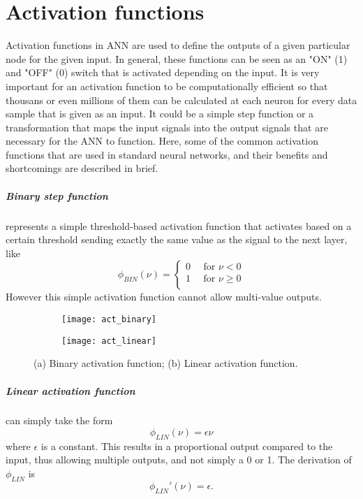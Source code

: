 \chapter{Activation functions}\label{app-act}
Activation functions in ANN are used to define the outputs of a given particular node for the given input. In general, these functions can be seen as an "ON" (1) and "OFF" (0) switch that is activated depending on the input. It is very important for an activation function to be computationally efficient so that thousans or even millions of them can be calculated at each neuron for every data sample that is given as an input. It could be a simple step function or a transformation that maps the input signals into the output signals that are necessary for the ANN to function. Here, some of the common activation functions that are used in standard neural networks, and their benefits and shortcomings are described in brief.

\paragraph*{Binary step function} represents a simple threshold-based activation function that activates based on a certain threshold sending exactly the same value as the signal to the next layer, like
\begin{equation}\label{app-act-1}
\phi_{BIN}(\nu)=
\begin{cases}
0\quad\text{ for }\nu<0\\
1\quad\text{ for }\nu\ge0\\
\end{cases}
\end{equation}
However this simple activation function cannot allow multi-value outputs.

\begin{figure}
	\centering
	\begin{subfigure}{0.45\textwidth}
		\texttt{[image: act\_binary]}
		\caption{}
	\end{subfigure}
	\begin{subfigure}{0.45\textwidth}
		\texttt{[image: act\_linear]}
		\caption{}
	\end{subfigure}
	\caption{(a) Binary activation function; (b) Linear activation function.}
\end{figure}

\paragraph*{Linear activation function} can simply take the form
\begin{equation}\label{app-act-2}
\phi_{LIN}(\nu)=\epsilon\nu
\end{equation}
where $ \epsilon $ is a constant. This results in a proportional output compared to the input, thus allowing multiple outputs, and not simply a 0 or 1. The derivation of $ \phi_{LIN} $ is
\begin{equation}\label{app-act-3}
\phi_{LIN}'(\nu)=\epsilon.
\end{equation}


